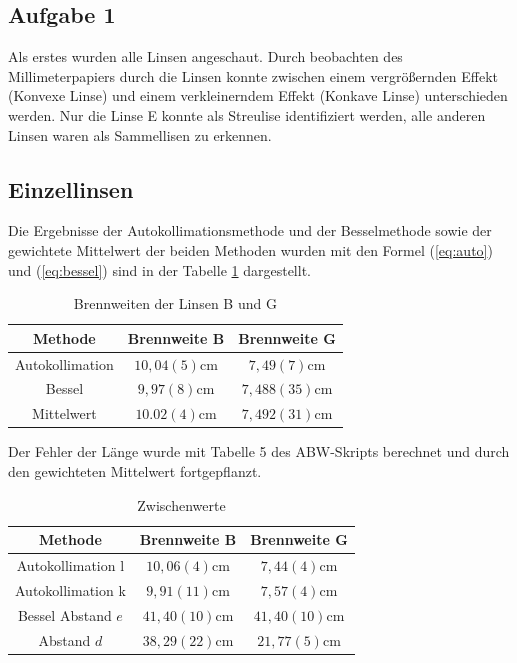 \documentclass[11pt, a4paper]{article}
\begin{document}
    \subsection{Aufgabe 1}
    Als erstes wurden alle Linsen angeschaut. Durch beobachten des Millimeterpapiers durch die Linsen konnte zwischen einem vergrößernden Effekt (Konvexe Linse) und einem verkleinerndem Effekt (Konkave Linse) unterschieden werden. Nur die Linse E konnte als Streulise identifiziert werden, alle anderen Linsen waren als Sammellisen zu erkennen.

    \subsection{Einzellinsen}
    Die Ergebnisse der Autokollimationsmethode und der Besselmethode sowie der gewichtete Mittelwert der beiden Methoden wurden mit den Formel (\ref{eq:auto}) und (\ref{eq:bessel}) sind in der Tabelle \ref{tab:ergebnisse} dargestellt.

    \begin{table}[h]
        \centering
        \begin{tabular}{c|c|c}
            Methode & Brennweite B & Brennweite G \\ \hline
            Autokollimation & $10,04(5) \si{\centi\metre}$ & $7,49(7) \si{\centi\metre}$ \\ \hline
            Bessel & $9,97(8) \si{\centi\metre}$ & $7,488(35) \si{\centi\metre}$ \\ \hline

            Mittelwert & $10.02(4) \si{\centi\metre}$ & $7,492(31) \si{\centi\metre}$

        \end{tabular}
        \caption{Brennweiten der Linsen B und G}
        \label{tab:ergebnisse}
    \end{table}

    Der Fehler der Länge wurde mit Tabelle 5 des ABW-Skripts \cite{ABW} berechnet und durch den gewichteten Mittelwert fortgepflanzt.


    \begin{table}[h]
        \centering
        \begin{tabular}{c|c|c}
            Methode & Brennweite B & Brennweite G \\ \hline
            Autokollimation l & $10,06(4) \si{\centi\metre}$ & $7,44(4) \si{\centi\metre}$ \\ \hline
            Autokollimation k & $9,91(11) \si{\centi\metre}$ & $7,57(4) \si{\centi\metre}$ \\ \hline
            Bessel Abstand $e$ & $41,40(10) \si{\centi\metre}$ & $41,40(10) \si{\centi\metre}$ \\ \hline
            Abstand $d$ & $38,29(22) \si{\centi\metre}$ & $21,77(5) \si{\centi\metre}$
        \end{tabular}
        \caption{Zwischenwerte }
        \label{tab:zwischen}
    \end{table}
\end{document}
